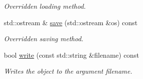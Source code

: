 \begin{DoxyCompactItemize}
\begin{DoxyCompactList}\small\item\em Overridden loading method. \end{DoxyCompactList}\item 
\hypertarget{a00430_a72bd05e9ca595d39541eff7c92a6264f}{std\-::ostream \& \hyperlink{a00430_a72bd05e9ca595d39541eff7c92a6264f}{save} (std\-::ostream \&os) const }\label{a00430_a72bd05e9ca595d39541eff7c92a6264f}

\begin{DoxyCompactList}\small\item\em Overridden saving method. \end{DoxyCompactList}\item 
\hypertarget{a00430_ab327834e6928401136a49fda9f0b7e61}{bool \hyperlink{a00430_ab327834e6928401136a49fda9f0b7e61}{write} (const std\-::string \&filename) const }\label{a00430_ab327834e6928401136a49fda9f0b7e61}

\begin{DoxyCompactList}\small\item\em Writes the object to the argument filename. \end{DoxyCompactList}\end{DoxyCompactItemize}
